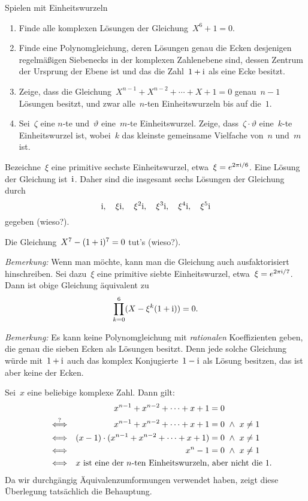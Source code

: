 \documentclass{algblatt}
\begin{document}
\begin{aufgabe}{Spielen mit Einheitswurzeln}
\begin{enumerate}
\item Finde alle komplexen Lösungen der Gleichung~$X^6 + 1 = 0$.
\item Finde eine Polynomgleichung, deren Lösungen genau die Ecken
desjenigen re\-gel\-mä\-ßi\-gen Siebenecks in der komplexen Zahlenebene sind, dessen Zentrum
der Ursprung der Ebene ist und das die Zahl~$1 + \mathrm{i}$ als eine Ecke besitzt.
\item Zeige, dass die Gleichung~$X^{n-1} + X^{n-2} + \cdots + X + 1 = 0$
genau~$n-1$ Lösungen besitzt, und zwar alle~$n$-ten Einheitswurzeln bis auf
die~$1$.
\item Sei~$\zeta$ eine $n$-te und~$\vartheta$ eine~$m$-te Einheitswurzel.
Zeige, dass~$\zeta \cdot \vartheta$ eine~$k$-te Einheitswurzel ist, wobei~$k$
das kleinste gemeinsame Vielfache von~$n$ und~$m$ ist.
\end{enumerate}
\begin{loesungE}
\item Bezeichne~$\xi$ eine primitive sechste Einheitswurzel, etwa~$\xi =
e^{2\pi\mathrm{i} / 6}$. Eine Lösung der Gleichung ist~$\mathrm{i}$. Daher sind die
insgesamt sechs Lösungen der Gleichung durch
\[ \mathrm{i},\quad \xi \mathrm{i},\quad \xi^2 \mathrm{i},\quad \xi^3 \mathrm{i},\quad \xi^4 \mathrm{i},\quad \xi^5 \mathrm{i} \]
gegeben (wieso?).
\item Die Gleichung~$X^7 - (1+\mathrm{i})^7 = 0$ tut's (wieso?).

\emph{Bemerkung:} Wenn man möchte, kann man die Gleichung auch ausfaktorisiert
hinschreiben. Sei dazu~$\xi$ eine primitive siebte Einheitswurzel, etwa~$\xi =
e^{2\pi\mathrm{i} / 7}$. Dann ist obige Gleichung äquivalent zu
\[ \prod_{k=0}^6 (X - \xi^k (1+\mathrm{i})) = 0. \]

\emph{Bemerkung:} Es kann keine Polynomgleichung mit \emph{rationalen}
Koeffizienten geben, die genau die sieben Ecken als Lösungen besitzt. Denn jede
solche Gleichung würde mit~$1+\mathrm{i}$ auch das komplex Konjugierte~$1-\mathrm{i}$ als
Lösung besitzen, das ist aber keine der Ecken.

\item Sei~$x$ eine beliebige komplexe Zahl. Dann gilt:
\begin{align*}
  && x^{n-1} + x^{n-2} + \cdots + x + 1 &= 0 \\
  \stackrel{?}{\Longleftrightarrow} &&
    x^{n-1} + x^{n-2} + \cdots + x + 1 &= 0 \ \wedge\  x \neq 1 \\
  \Longleftrightarrow &&
    (x - 1) \cdot (x^{n-1} + x^{n-2} + \cdots + x + 1) &= 0 \ \wedge\  x \neq 1 \\
  \Longleftrightarrow &&
    x^n - 1 &= 0 \ \wedge\  x \neq 1 \\
  \Longleftrightarrow &&
    \omit\rlap{\text{$x$ ist eine der~$n$-ten Einheitswurzeln, aber nicht
    die~$1$.}}
\end{align*}
Da wir durchgängig Äquivalenzumformungen verwendet haben, zeigt diese
Überlegung tatsächlich die Behauptung.


\end{loesungE}
\end{aufgabe}
\end{document}
